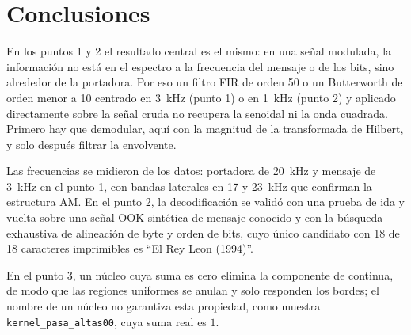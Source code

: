 
\section{Conclusiones}
\label{sec:conclusiones}

En los puntos 1 y 2 el resultado central es el mismo: en una señal
modulada, la información no está en el espectro a la frecuencia del
mensaje o de los bits, sino alrededor de la portadora. Por eso un filtro
FIR de orden 50 o un Butterworth de orden menor a 10 centrado en 3~kHz
(punto 1) o en 1~kHz (punto 2) y aplicado directamente sobre la señal
cruda no recupera la senoidal ni la onda cuadrada. Primero hay que
demodular, aquí con la magnitud de la transformada de Hilbert, y solo
después filtrar la envolvente.

Las frecuencias se midieron de los datos: portadora de 20~kHz y mensaje de
3~kHz en el punto 1, con bandas laterales en 17 y 23~kHz que confirman la
estructura AM. En el punto 2, la decodificación se validó con una prueba
de ida y vuelta sobre una señal OOK sintética de mensaje conocido y con la
búsqueda exhaustiva de alineación de byte y orden de bits, cuyo único
candidato con 18 de 18 caracteres imprimibles es
``El Rey Leon (1994)''.

En el punto 3, un núcleo cuya suma es cero elimina la componente de
continua, de modo que las regiones uniformes se anulan y solo responden
los bordes; el nombre de un núcleo no garantiza esta propiedad, como
muestra \texttt{kernel\_pasa\_altas00}, cuya suma real es $1$.
